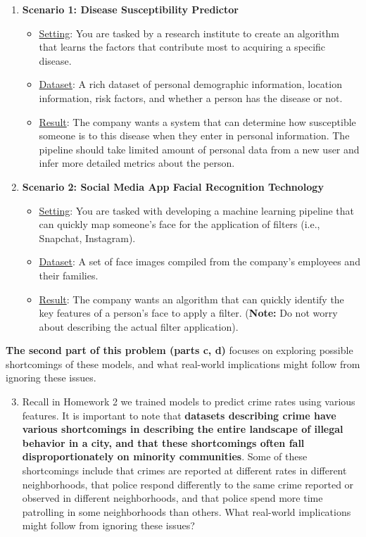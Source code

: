 \documentclass{article}
\begin{document}
\begin{aprob}
\begin{enumerate}
    \item {} \textbf{Scenario 1: Disease Susceptibility Predictor}
\begin{itemize}
    \item \underline{Setting}: You are tasked by a research institute to create an algorithm that learns the factors that contribute most to acquiring a specific disease.
    \item \underline{Dataset}: A rich dataset of personal demographic information, location information, risk factors, and whether a person has the disease or not.
    \item \underline{Result}: The company wants a system that can determine how susceptible someone is to this disease when they enter in personal information. The pipeline should take limited amount of personal data from a new user and infer more detailed metrics about the person.
\end{itemize}
\item {} \textbf{Scenario 2: Social Media App Facial Recognition Technology}
\begin{itemize}
    \item \underline{Setting}: You are tasked with developing a machine learning pipeline that can quickly map someone’s face for the application of filters (i.e., Snapchat, Instagram).
    \item \underline{Dataset}: A set of face images compiled from the company’s employees and their families.
    \item  \underline{Result}: The company wants an algorithm that can quickly identify the key features of a person’s face to apply a filter. (\textbf{Note:} Do not worry about describing the actual filter application).
\end{itemize}
\end{enumerate}

\textbf{The second part of this problem (parts c, d)} focuses on exploring possible shortcomings of these models, and what real-world implications might follow from ignoring these issues.

\begin{enumerate}
\setcounter{enumi}{2}
\item {} Recall in Homework 2 we trained models to predict crime rates using various features. It is important to note that \textbf{datasets describing crime have various shortcomings in describing the entire landscape of illegal behavior in a city, and that these shortcomings often fall disproportionately on minority communities}. Some of these shortcomings include that crimes are reported at different rates in different neighborhoods, that police respond differently to the same crime reported or observed in different neighborhoods, and that police spend more time patrolling in some neighborhoods than others. What real-world implications might follow from ignoring these issues?


\end{enumerate}
\end{aprob}
\end{document}
